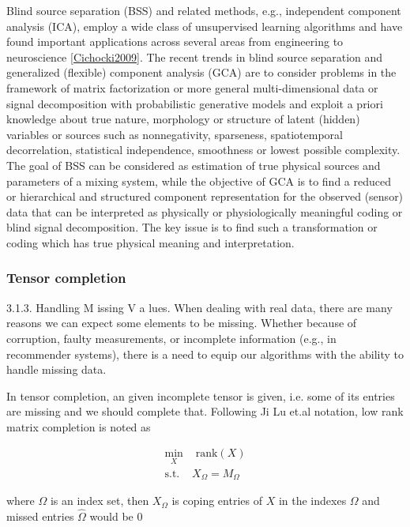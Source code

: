 \documentclass[letterpaper,12pt]{article}
\begin{document}
Blind source separation (BSS) and related methods, e.g., independent component analysis (ICA), employ a wide class of unsupervised learning algorithms and have found important applications across several areas from engineering to neuroscience \ref{Cichocki2009}. The recent trends in blind source separation and generalized (flexible) component analysis (GCA) are to consider problems in the framework of matrix factorization or more general multi-dimensional data or signal decomposition with probabilistic generative models and exploit a priori knowledge about true nature, morphology or structure of latent (hidden) variables or sources such as nonnegativity, sparseness, spatiotemporal decorrelation, statistical independence, smoothness or lowest possible complexity. The goal of BSS can be considered as estimation of true physical sources and parameters of a mixing system, while the objective of GCA is to find a reduced or hierarchical and structured component representation for the observed (sensor) data that can be interpreted as physically or physiologically meaningful coding or blind signal decomposition. The key issue is to find such a transformation or coding which has true physical meaning and interpretation.

 \subsubsection{Tensor completion}
 
 3.1.3. Handling M issing V a lues. When dealing with real data, there are many reasons we can expect some elements to be missing. Whether because of corruption, faulty measurements, or incomplete information (e.g., in recommender systems), there is a need to equip our algorithms with the ability to handle missing data.\cite{Papalexakis2016}
 
 In tensor completion, an given incomplete tensor is given, i.e. some of its entries are missing and we should complete that. Following Ji Lu et.al \cite{Liu2013} notation,  low rank matrix completion is noted as

\begin{equation} 
 \begin{split}
  \min_X & \text{ rank}(X)\\
  \text{s.t. } & X_\Omega = M_\Omega
 \end{split}
\end{equation}

where $\Omega$ is an index set, then $X_\Omega$ is coping entries of $X$ in the indexes $\Omega$ and missed entries $\hat{\Omega}$ would be $0$
\end{document}

